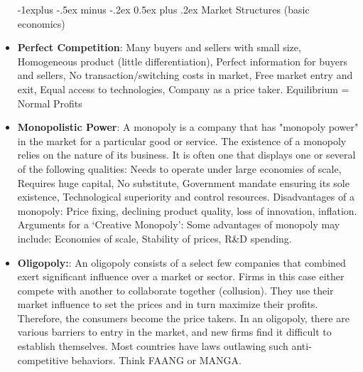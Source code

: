 \documentclass[12pt, landscape]{article}
\makeatletter
\renewcommand{\subsection}{\@startsection{subsection}{2}{0mm}%
                                {-1explus -.5ex minus -.2ex}%
                                {0.5ex plus .2ex}%
                                {\normalfont\normalsize\bfseries}}
\makeatother
\begin{document}
\begin{multicols*}{3}
\begin{itemize}
\subsection{Market Structures (basic economics)}
\item \textbf{Perfect Competition}: Many buyers and sellers with small size, Homogeneous product (little differentiation), Perfect information for buyers and sellers, No transaction/switching costs in market, Free market entry and exit, Equal access to technologies, Company as a price taker. Equilibrium = Normal Profits
\item \textbf{Monopolistic Power}: A monopoly is a company that has "monopoly power" in the market for a particular good or service. The existence of a monopoly relies on the nature of its business. It is often one that displays one or several of the following qualities: Needs to operate under large economies of scale, Requires huge capital, No substitute, Government mandate ensuring its sole existence, Technological superiority and control resources. Disadvantages of a monopoly: Price fixing, declining product quality, loss of innovation, inflation.
\\ Arguments for a `Creative Monopoly': Some advantages of monopoly may include: Economies of scale, Stability of prices, R\&D spending.
\item \textbf{Oligopoly:}: An oligopoly consists of a select few companies that combined exert significant influence over a market or sector. Firms in this case either compete with another to collaborate together (collusion). They use their market influence to set the prices and in turn maximize their profits. Therefore, the consumers become the price takers. In an oligopoly, there are various barriers to entry in the market, and new firms find it difficult to establish themselves. Most countries have laws outlawing such anti-competitive behaviors. Think FAANG or MANGA.
\end{itemize}



\end{multicols*}
\end{document}
